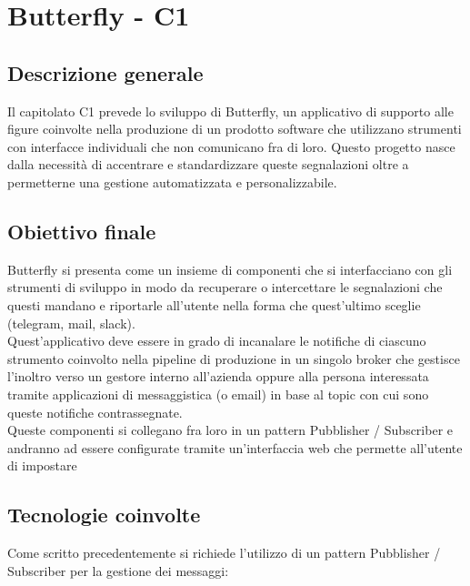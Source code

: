 \section{Butterfly - C1} \label{c1}
    \subsection{Descrizione generale}
	Il capitolato C1 prevede lo sviluppo di Butterfly, un applicativo di supporto alle figure coinvolte nella produzione di un prodotto software che utilizzano strumenti con interfacce individuali che non comunicano fra di loro.
	Questo progetto nasce dalla necessità di accentrare e standardizzare queste segnalazioni oltre a permetterne una gestione automatizzata e personalizzabile.

    \subsection{Obiettivo finale}
    Butterfly si presenta come un insieme di componenti che si interfacciano con gli strumenti di sviluppo in modo da recuperare o intercettare le segnalazioni che questi mandano e riportarle all'utente nella forma che quest'ultimo sceglie (telegram, mail, slack).\\
    Quest'applicativo deve essere in grado di incanalare le notifiche di ciascuno strumento coinvolto nella pipeline di produzione in un singolo broker che gestisce l'inoltro verso un gestore interno all'azienda oppure alla persona interessata tramite applicazioni di messaggistica (o email) in base al topic con cui sono queste notifiche contrassegnate.\\
    Queste componenti si collegano fra loro in un pattern Pubblisher / Subscriber e andranno ad essere configurate tramite un'interfaccia web che permette all'utente di impostare 

    \subsection{Tecnologie coinvolte}
	Come scritto precedentemente si richiede l'utilizzo di un pattern Pubblisher / Subscriber per la gestione dei messaggi:

